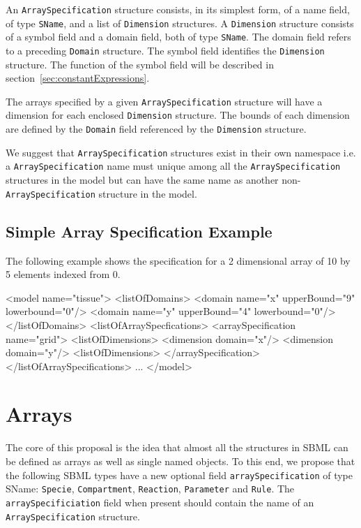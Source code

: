 \documentclass{cekarticle}
\begin{document}
An \texttt{ArraySpecification} structure consists, in its
simplest form, of a name field, of type \texttt{SName}, and a list
of \texttt{Dimension} structures.  A \texttt{Dimension} structure
consists of a symbol field and a domain field, both of type
\texttt{SName}.  The domain field refers to a preceding
\texttt{Domain} structure.  The symbol field identifies the
\texttt{Dimension} structure.  The function of the symbol field will be
described in section~\ref{sec:constantExpressions}.

The arrays specified by a given \texttt{ArraySpecification}
structure will have a dimension for each enclosed
\texttt{Dimension} structure.  The bounds of each dimension are
defined by the \texttt{Domain} field referenced by the
\texttt{Dimension} structure.

We suggest that \texttt{ArraySpecification} structures exist in
their own namespace i.e. a \texttt{ArraySpecification} name must
unique among all the \texttt{ArraySpecification} structures in
the model but can have the same name as another
non-\texttt{ArraySpecification} structure in the model.

\subsection{Simple Array Specification Example}
\label{sec:simplearray}

The following example shows the specification for a 2 dimensional
array of 10 by 5 elements indexed from 0.

\begin{example}
<model name="tissue">
    <listOfDomains>
        <domain name="x" upperBound="9" lowerbound="0"/>
        <domain name="y" upperBound="4" lowerbound="0"/>
    </listOfDomains>
    <listOfArraySpecfications>
        <arraySpecification name="grid">
            <listOfDimensions>
                <dimension domain="x"/>
                <dimension domain="y"/>
            <listOfDimensions>
        </arraySpecification>
    </listOfArraySpecifications>
    ...
</model>
\end{example}

\section{Arrays}

The core of this proposal is the idea that almost all the
structures in SBML can be defined as arrays as well as single
named objects.  To this end, we propose that the following SBML
types have a new optional field \texttt{arraySpecification} of
type SName: \texttt{Specie}, \texttt{Compartment},
\texttt{Reaction}, \texttt{Parameter} and \texttt{Rule}.  The
\texttt{arraySpecificiation} field when present should contain
the name of an \texttt{ArraySpecification} structure.
\end{document}
